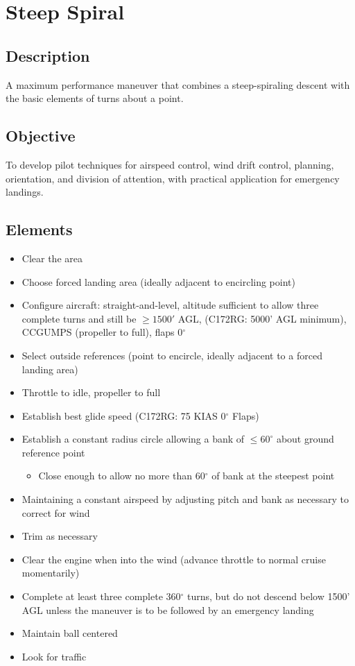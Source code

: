 \section{Steep Spiral}

\subsection{Description}

A maximum performance maneuver that combines a steep-spiraling descent with the
basic elements of turns about a point.

\subsection{Objective}

To develop pilot techniques for airspeed control, wind drift control, planning,
orientation, and division of attention, with practical application for
emergency landings.

\subsection{Elements}

\begin{itemize}
  \item Clear the area
  \item Choose forced landing area (ideally adjacent to encircling point) \item
    Configure aircraft: straight-and-level, altitude sufficient to allow three
    complete turns and still be $\geq 1500'$ AGL, (C172RG: 5000' AGL minimum),
    CCGUMPS (propeller to full), flaps 0$^\circ$ 
  \item Select outside references (point to encircle, ideally adjacent to a
    forced landing area)
  \item Throttle to idle, propeller to full 
  \item Establish best glide speed (C172RG: 75 KIAS 0$^\circ$ Flaps)
  \item Establish a constant radius circle allowing a bank of $\leq 60^\circ$
    about ground reference point 
    \begin{itemize}
      \item Close enough to allow no more than 60$^\circ$ of bank at the steepest point
    \end{itemize}
  \item Maintaining a constant airspeed by adjusting pitch and bank as
    necessary to correct for wind 
  \item Trim as necessary
  \item Clear the engine when into the wind (advance throttle to normal cruise
    momentarily)
  \item Complete at least three complete 360$^\circ$ turns, but do not descend below
    1500' AGL unless the maneuver is to be followed by an emergency landing
  \item Maintain ball centered
  \item Look for traffic
\end{itemize}

